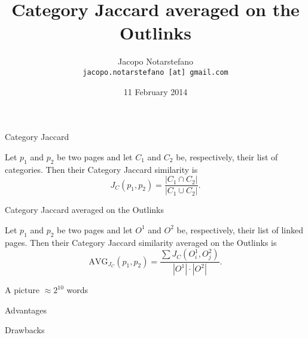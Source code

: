 \documentclass[12pt]{beamer}
\title{Category Jaccard averaged on the Outlinks}
\author[Jacopo Notarstefano]{
    Jacopo Notarstefano\\
    \texttt{jacopo.notarstefano [at] gmail.com}
}
\date{11 February 2014}
\begin{document}
    \begin{frame}[plain]
        \titlepage
    \end{frame}

    \begin{frame}{Category Jaccard}
        \begin{definition}
            Let \(p_1\) and \(p_2\) be two pages and let \(C_1\) and \(C_2\)
            be, respectively, their list of categories. Then their Category
            Jaccard similarity is
            \[
                J_C(p_1, p_2) = \frac{|C_1\cap C_2|}{|C_1\cup C_2|}\text{.}
            \]
        \end{definition}
    \end{frame}

    \begin{frame}{Category Jaccard averaged on the Outlinks}
        \begin{definition}
            Let \(p_1\) and \(p_2\) be two pages and let \(O^1\) and \(O^2\) be,
            respectively, their list of linked pages. Then their
            Category Jaccard similarity averaged on the Outlinks is
            \[
                \text{AVG}_{J_C}(p_1, p_2) = \frac{\sum{J_C(O^1_i, O^2_j)}}{|O^1|\cdot|O^2|}\text{.}
            \]
        \end{definition}
    \end{frame}


    \begin{frame}{A picture \(\approx 2^{10}\) words}
        \begin{figure}
            \centering
        \end{figure}
    \end{frame}

    \begin{frame}{Advantages}
    \end{frame}

    \begin{frame}{Drawbacks}
    \end{frame}
\end{document}

